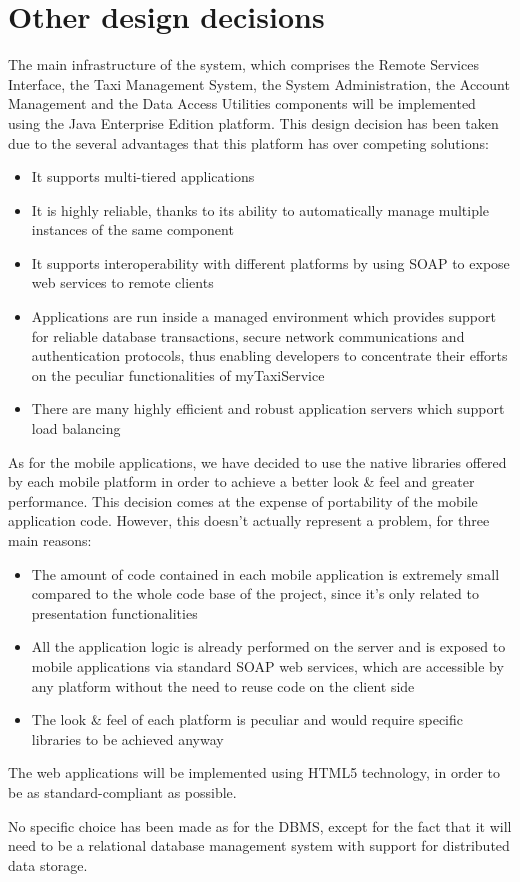 \section{Other design decisions}
The main infrastructure of the system, which comprises the Remote Services Interface, the Taxi Management System, the System Administration, the Account Management and the Data Access Utilities components will be implemented using the Java Enterprise Edition platform. This design decision has been taken due to the several advantages that this platform has over competing solutions:
\begin{itemize}
	\item It supports multi-tiered applications
	\item It is highly reliable, thanks to its ability to automatically manage multiple instances of the same component
	\item It supports interoperability with different platforms by using SOAP to expose web services to remote clients 
	\item Applications are run inside a managed environment which provides support for reliable database transactions, secure network communications and authentication protocols, thus enabling developers to concentrate their efforts on the peculiar functionalities of myTaxiService
	\item There are many highly efficient and robust application servers which support load balancing
\end{itemize}

As for the mobile applications, we have decided to use the native libraries offered by each mobile platform in order to achieve a better look \& feel and greater performance. This decision comes at the expense of portability of the mobile application code. However, this doesn't actually represent a problem, for three main reasons:
\begin{itemize}
	\item The amount of code contained in each mobile application is extremely small compared to the whole code base of the project, since it's only related to presentation functionalities
	\item All the application logic is already performed on the server and is exposed to mobile applications via standard SOAP web services, which are accessible by any platform without the need to reuse code on the client side
	\item The look \& feel of each platform is peculiar and would require specific libraries to be achieved anyway 
\end{itemize}

The web applications will be implemented using HTML5 technology, in order to be as standard-compliant as possible.

No specific choice has been made as for the DBMS, except for the fact that it will need to be a relational database management system with support for distributed data storage.